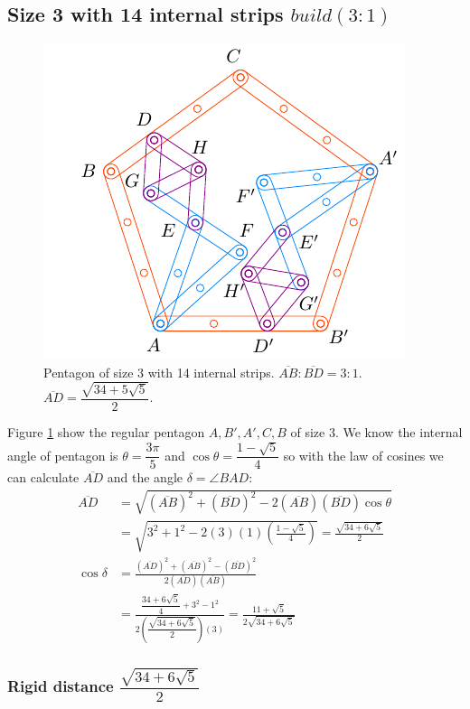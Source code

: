 \documentclass[11pt]{article}
\begin{document}
\subsection{Size 3 with 14 internal strips $build(3:1)$}

\begin{figure}[H]
\centering
\includegraphics[scale=1.2]{3/penta3-14a}
\caption{Pentagon of size 3 with 14 internal strips. $\overline{AB}:\overline{BD} = 3:1$. $\overline{AD} = \dfrac{\sqrt{34+5\sqrt5}}2$.}
\label{fig:penta3-14a}
\end{figure}

Figure \ref{fig:penta3-14a} show the regular pentagon $A,B',A',C,B$ of size $3$. We know the internal angle of pentagon is $\theta=\dfrac{3\pi}5$ and $\cos\theta=\dfrac{1-\sqrt5}4$ so with the law of cosines we can calculate $\overline{AD}$ and the angle $\delta = \angle{BAD}$:
\begin{align}
\overline{AD} &= \sqrt{(\overline{AB})^2 + (\overline{BD})^2
 - 2(\overline{AB})(\overline{BD})\cos\theta} \nonumber\\
 &= \sqrt{3^2 + 1^2 - 2(3)(1)\left(\frac{1-\sqrt5}4\right)} = \frac{\sqrt{34+6\sqrt5}}2\\
\cos\delta &= \frac{(\overline{AD})^2 + (\overline{AB})^2 - (\overline{BD})^2}
 {2(\overline{AD})(\overline{AB})} \nonumber\\
 &= \frac{\dfrac{34+6\sqrt5}4 + 3^2 - 1^2}{2\left(\dfrac{\sqrt{34+6\sqrt5}}2\right)(3)}
  = \frac{11+\sqrt5}{2\sqrt{34+6\sqrt5}}
\end{align}

\subsubsection{Rigid distance  $\dfrac{\sqrt{34+6\sqrt5}}2$}
\end{document}
